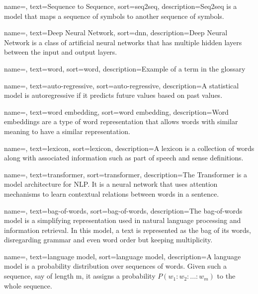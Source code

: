 {
    name=,
    text=Sequence to Sequence,
    sort=seq2seq,
    description={Seq2seq is a model that maps a sequence of symbols to another sequence of symbols.}
}

{
    name=,
    text=Deep Neural Network,
    sort=dnn,
    description={Deep Neural Network is a class of artificial neural networks that has multiple hidden layers between the input and output layers.}
}







{
    name=,
    text=word,
    sort=word,
    description={Example of a term in the glossary}
}

{
    name=,
    text=auto-regressive,
    sort=auto-regressive,
    description={A statistical  model is autoregressive if it predicts future values based on past values.}
}

{
    name=,
    text=word embedding,
    sort=word embedding,
    description={Word embeddings are a type of word representation that allows words with similar meaning to have a similar representation.}
}

{
    name=,
    text=lexicon,
    sort=lexicon,
    description={A lexicon is a collection of words along with associated information such as part of speech and sense definitions.}
}


{
    name=,
    text=transformer,
    sort=transformer,
    description={The Transformer is a model architecture for NLP. It is a neural network that uses attention mechanisms to learn contextual relations between words in a sentence.}
}

{
    name=,
    text=bag-of-words,
    sort=bag-of-words,
    description={The bag-of-words model is a simplifying representation used in natural language processing and information retrieval. In this model, a text is represented as the bag of its words, disregarding grammar and even word order but keeping multiplicity.}
}

{
    name=,
    text=language model,
    sort=language model,
    description={A language model is a probability distribution over sequences of words. Given such a sequence, say of length m, it assigns a probability $P(w_1:w_2:...:w_m)$ to the whole sequence.}
}





